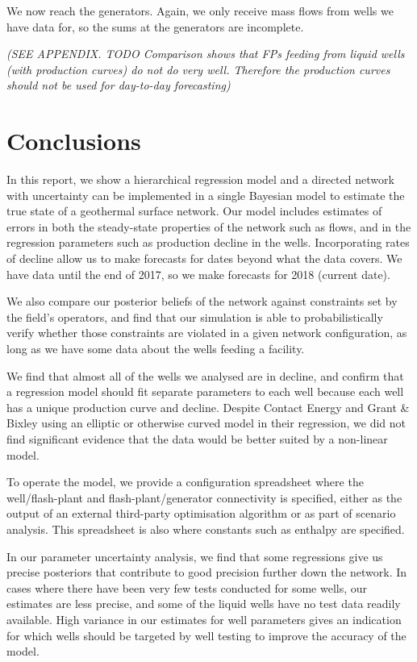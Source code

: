 \documentclass[a4paper, 12pt]{article}
\begin{document}
We now reach the generators. Again, we only receive mass flows from wells we have data for, so the sums at the generators are incomplete.

\emph{(SEE APPENDIX. TODO Comparison shows that FPs feeding from liquid wells (with production curves) do not do very well. Therefore the production curves should not be used for day-to-day forecasting)}

\section{Conclusions}
In this report, we show a hierarchical regression model and a directed network with uncertainty can be implemented in a single Bayesian model to estimate the true state of a geothermal surface network. Our model includes estimates of errors in both the steady-state properties of the network such as flows, and in the regression parameters such as production decline in the wells. Incorporating rates of decline allow us to make forecasts for dates beyond what the data covers. We have data until the end of 2017, so we make forecasts for 2018 (current date).

We also compare our posterior beliefs of the network against constraints set by the field's operators, and find that our simulation is able to probabilistically verify whether those constraints are violated in a given network configuration, as long as we have some data about the wells feeding a facility.

We find that almost all of the wells we analysed are in decline, and confirm that a regression model should fit separate parameters to each well because each well has a unique production curve and decline. Despite Contact Energy and Grant \& Bixley using an elliptic or otherwise curved model in their regression, we did not find significant evidence that the data would be better suited by a non-linear model.

To operate the model, we provide a configuration spreadsheet where the well/flash-plant and flash-plant/generator connectivity is specified, either as the output of an external third-party optimisation algorithm or as part of scenario analysis. This spreadsheet is also where constants such as enthalpy are specified.

In our parameter uncertainty analysis, we find that some regressions give us precise posteriors that contribute to good precision further down the network. In cases where there have been very few tests conducted for some wells, our estimates are less precise, and some of the liquid wells have no test data readily available. High variance in our estimates for well parameters gives an indication for which wells should be targeted by well testing to improve the accuracy of the model.
\end{document}
